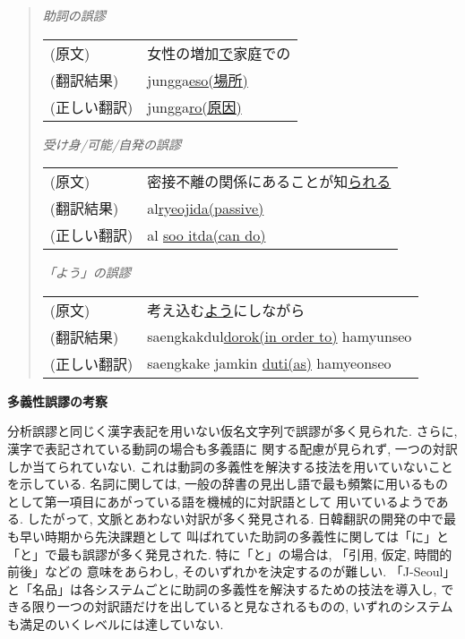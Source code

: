 \begin{quote}
\begin{flushleft}
{\it 助詞の誤謬}
\end{flushleft}

\begin{tabular}{ll}
  (原文)      & 女性の増加\underline{で}家庭での \\
  (翻訳結果)  & jungga\underline{eso(場所)} \\
  (正しい翻訳)& jungga\underline{ro(原因)} \\
\end{tabular}

\vspace{0.5cm}

\begin{flushleft}
{\it 受け身/可能/自発の誤謬}
\end{flushleft}

\begin{tabular}{ll}
  (原文)      & 密接不離の関係にあることが知\underline{られる} \\
  (翻訳結果)  & al\underline{ryeojida(passive)} \\
  (正しい翻訳)& al \underline{soo itda(can do)} \\
\end{tabular}

\vspace{0.5cm}

\begin{flushleft}
{\it 「よう」の誤謬}
\end{flushleft}

\begin{tabular}{ll}
  (原文)      & 考え込む\underline{よう}にしながら \\
  (翻訳結果)  & saengkakdul\underline{dorok(in order to)} hamyunseo \\
  (正しい翻訳)& saengkake jamkin \underline{duti(as)} hamyeonseo \\
\end{tabular}
\end{quote}

\vspace{0.5cm}

\begin{flushleft}
{\bf 多義性誤謬の考察}
\end{flushleft}

分析誤謬と同じく漢字表記を用いない仮名文字列で誤謬が多く見られた. さらに, 漢字で表記されている動詞の場合も多義語に
関する配慮が見られず, 一つの対訳しか当てられていない. これは動詞の多義性を解決する技法を用いていないことを示している. 
名詞に関しては, 一般の辞書の見出し語で最も頻繁に用いるものとして第一項目にあがっている語を機械的に対訳語として
用いているようである. したがって, 文脈とあわない対訳が多く発見される. 日韓翻訳の開発の中で最も早い時期から先決課題として
叫ばれていた助詞の多義性に関しては「に」と「と」で最も誤謬が多く発見された. 特に「と」の場合は, 「引用, 仮定, 時間的前後」などの
意味をあらわし, そのいずれかを決定するのが難しい. 「J-Seoul」と「名品」は各システムごとに助詞の多義性を解決するための技法を導入し, 
できる限り一つの対訳語だけを出していると見なされるものの, いずれのシステムも満足のいくレベルには達していない. 

